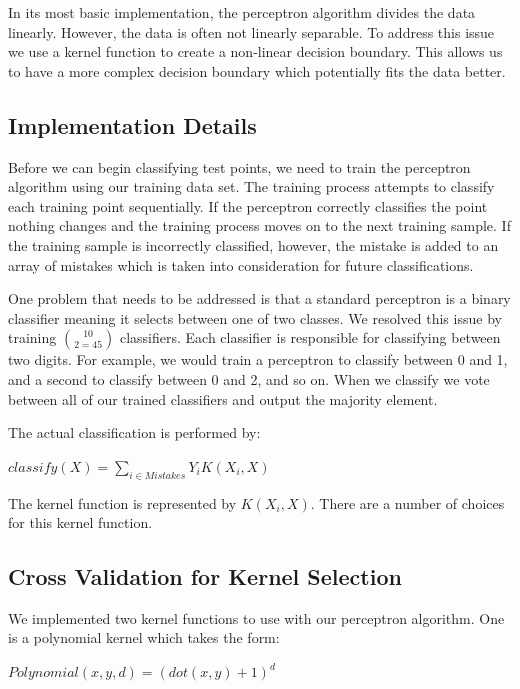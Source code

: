 \documentclass{article} %
\begin{document}
In its most basic implementation, the perceptron algorithm divides the data
linearly. However, the data is often not linearly separable. To address this
issue we use a kernel function to create a non-linear decision boundary. This
allows us to have a more complex decision boundary which potentially fits the
data better.

\subsection{Implementation Details}

Before we can begin classifying test points, we need to train the perceptron
algorithm using our training data set. The training process attempts
to classify each training point sequentially. If the perceptron correctly
classifies the point nothing changes and the training process moves on to the
next training sample. If the training sample is incorrectly classified, however,
the mistake is added to an array of mistakes which is taken into consideration
for future classifications.

One problem that needs to be addressed is that a standard perceptron is a binary
classifier meaning it selects between one of two classes. We resolved this issue
by training $10 \choose 2 = 45$ classifiers. Each classifier is responsible for
classifying between two digits. For example, we would train a perceptron to
classify between 0 and 1, and a second to classify between 0 and 2, and so
on. When we classify we vote between all of our trained classifiers and output
the majority element.

The actual classification is performed by:

\begin{center}
$classify(X) = \sum\limits_{i \in Mistakes}{Y_iK(X_i, X)}$
\end{center}

The kernel function is represented by $K(X_i, X)$. There are a number of choices
for this kernel function.

\subsection{Cross Validation for Kernel Selection}

We implemented two kernel functions to use with our perceptron algorithm. One is
a polynomial kernel which takes the form:

\begin{center}
$Polynomial(x, y, d) = (dot(x, y) + 1)^d$
\end{center}
\end{document}

